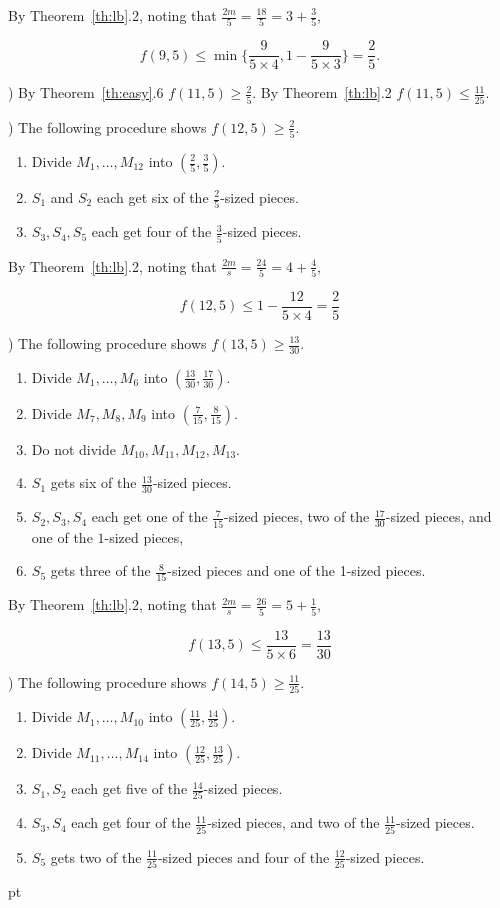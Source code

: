 \documentclass[12pt]{article}
\newenvironment{proof}
    {\pagebreak[1]{\narrower\noindent {\bf Proof:\quad\nopagebreak}}}{\QED}
\newcommand{\yyskip}{\penalty-50\vskip 5pt plus 3pt minus 2pt}
\newcommand{\blackslug}{\hbox{\hskip 1pt
        \vrule width 4pt height 8pt depth 1.5pt\hskip 1pt}}
\newcommand{\QED}{{\penalty10000\parindent 0pt\penalty10000
        \hskip 8 pt\nolinebreak\blackslug\hfill\lower 8.5pt\null}
        \par\yyskip\pagebreak[1]}
\begin{document}
\begin{proof}
By Theorem~\ref{th:lb}.2,  
noting that $\frac{2m}{5}=\frac{18}{5}=3+\frac{3}{5}$,


$$f(9,5) \le  \min\biggl \{
\frac{9}{5\times 4},
1-\frac{9}{5\times 3}
\biggr \}
=
\frac{2}{5}.
$$


) By Theorem~\ref{th:easy}.6  $f(11,5) \ge \frac{2}{5}$.
By Theorem~\ref{th:lb}.2 $f(11,5)\le \frac{11}{25}$.

) The following procedure shows $f(12,5) \ge \frac{2}{5}$.

\begin{enumerate}
\item
Divide $M_{1},\ldots,M_{12}$ into $(\frac{2}{5},\frac{3}{5})$.
\item
$S_1$ and $S_2$ each get six of the $\frac{2}{5}$-sized pieces.
\item
$S_3,S_4,S_5$ each get four of the $\frac{3}{5}$-sized pieces.
\end{enumerate}


By Theorem~\ref{th:lb}.2, noting that $\frac{2m}{s}=\frac{24}{5}=4+\frac{4}{5}$,


$$f(12,5) \le 1-\frac{12}{5\times 4}=\frac{2}{5}$$

) The following procedure shows $f(13,5) \ge \frac{13}{30}$.

\begin{enumerate}
\item
Divide $M_1,\ldots,M_6$ into $(\frac{13}{30},\frac{17}{30})$.
\item
Divide $M_7,M_8,M_9$ into  $(\frac{7}{15},\frac{8}{15})$.
\item
Do not divide $M_{10},M_{11},M_{12},M_{13}$.
\item
$S_1$ gets six of the $\frac{13}{30}$-sized pieces.
\item
$S_2,S_3,S_4$ each get one of the $\frac{7}{15}$-sized pieces,
two of the $\frac{17}{30}$-sized pieces, and
one of the $1$-sized pieces, 
\item
$S_5$ gets three of the $\frac{8}{15}$-sized pieces and one of the 1-sized pieces.
\end{enumerate}

By Theorem~\ref{th:lb}.2, noting that $\frac{2m}{s}=\frac{26}{5}=5+\frac{1}{5}$,

$$f(13,5) \le \frac{13}{5\times 6}=\frac{13}{30}$$

) The following procedure shows $f(14,5) \ge \frac{11}{25}$.

\begin{enumerate}
\item
Divide $M_1,\ldots,M_{10}$ into $(\frac{11}{25},\frac{14}{25})$.
\item
Divide $M_{11},\ldots,M_{14}$ into  $(\frac{12}{25},\frac{13}{25})$.
\item
$S_1,S_2$ each get five of the $\frac{14}{25}$-sized pieces.
\item
$S_3,S_4$ each get four of the $\frac{11}{25}$-sized pieces,
and two of the $\frac{11}{25}$-sized pieces.
\item
$S_5$ gets two of the $\frac{11}{25}$-sized pieces and 
four of the $\frac{12}{25}$-sized pieces.
\end{enumerate}


\end{proof}
\end{document}
